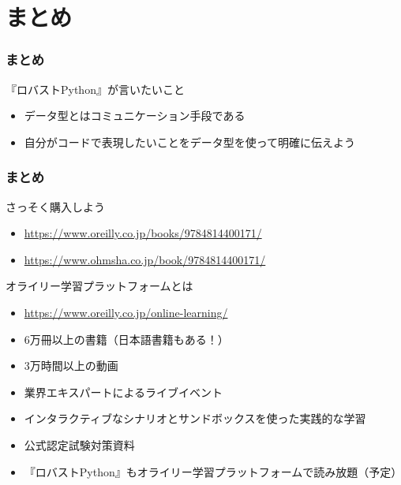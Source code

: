 \documentclass[aspectratio=169,dvipdfmx,12pt,notheorems]{beamer}
\theoremstyle{definition}
\begin{document}
\section{まとめ}

\begin{frame}\frametitle{まとめ}

\begin{block}{『ロバストPython』が言いたいこと}
\begin{itemize}
\item データ型とはコミュニケーション手段である
\item 自分がコードで表現したいことをデータ型を使って明確に伝えよう
\end{itemize}
\end{block}

\end{frame}

\begin{frame}\frametitle{まとめ}

\begin{block}{さっそく購入しよう}
\begin{itemize}
\item \url{https://www.oreilly.co.jp/books/9784814400171/}
\item \url{https://www.ohmsha.co.jp/book/9784814400171/}
\end{itemize}
\end{block}

\begin{block}{オライリー学習プラットフォームとは}
\begin{itemize}
\item \url{https://www.oreilly.co.jp/online-learning/}
\item 6万冊以上の書籍（日本語書籍もある！）
\item 3万時間以上の動画
\item 業界エキスパートによるライブイベント
\item インタラクティブなシナリオとサンドボックスを使った実践的な学習
\item 公式認定試験対策資料
\item 『ロバストPython』もオライリー学習プラットフォームで読み放題（予定）
\end{itemize}
\end{block}

\end{frame}
\end{document}
